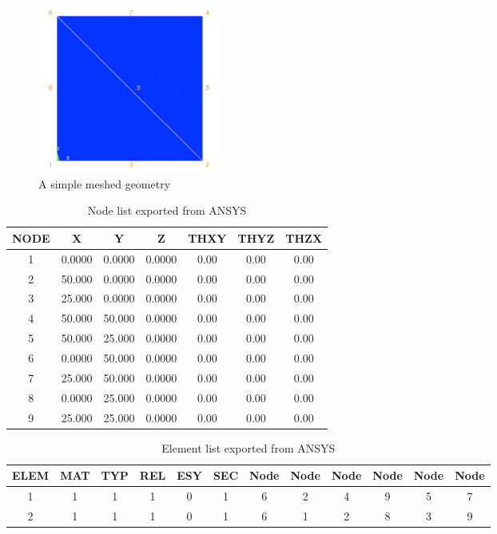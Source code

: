 \begin{figure}
	\begin{center}
		\includegraphics[width=6cm,clip]{muster.png} 			
		\caption{A simple meshed geometry} \label{fig: muster}
	\end{center}
\end{figure}

\begin{table}
	\begin{center}
		\caption{Node list exported from ANSYS}\label{tab: node_list}
		\begin{tabular}{ ccccccc }
			\hline			
			NODE & X & Y & Z & THXY & THYZ & THZX\\ \hline
			1 & 0.0000 & 0.0000 & 0.0000 & 0.00 & 0.00 & 0.00 \\
			2 & 50.000 & 0.0000 & 0.0000 & 0.00 & 0.00 & 0.00 \\
			3 & 25.000 & 0.0000 & 0.0000 & 0.00 & 0.00 & 0.00 \\
			4 & 50.000 & 50.000 & 0.0000 & 0.00 & 0.00 & 0.00 \\
			5 & 50.000 & 25.000 & 0.0000 & 0.00 & 0.00 & 0.00 \\
			6 & 0.0000 & 50.000 & 0.0000 & 0.00 & 0.00 & 0.00 \\
			7 & 25.000 & 50.000 & 0.0000 & 0.00 & 0.00 & 0.00 \\
			8 & 0.0000 & 25.000 & 0.0000 & 0.00 & 0.00 & 0.00 \\
			9 & 25.000 & 25.000 & 0.0000 & 0.00 & 0.00 & 0.00 \\
			\hline  
		\end{tabular}	
	\end{center}
\end{table}

\begin{table}
	\begin{center}
		\caption{Element list exported from ANSYS}\label{tab: element_list}
		\begin{tabular}{ cccccccccccc }
			\hline			
			ELEM & MAT & TYP & REL & ESY & SEC & Node & Node  & Node & Node & Node & Node\\ \hline
			1 & 1 & 1 & 1 & 0 & 1 & 6 & 2 & 4 & 9 & 5 & 7 \\
			2 & 1 & 1 & 1 & 0 & 1 & 6 & 1 & 2 & 8 & 3 & 9 \\
			\hline  
		\end{tabular}		
	\end{center}	
\end{table}

